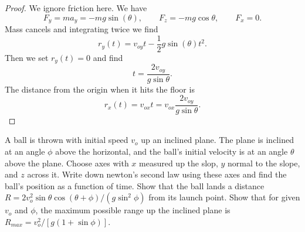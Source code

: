 \begin{proof}
    We ignore friction here.
    We have 
    \[F_y = m a_y = - m g \sin(\theta), \qquad F_z = -mg\cos\theta, \qquad F_x = 0.\]
    Mass cancels and integrating twice we find 
    \[r_y(t) = v_{oy} t - \frac{1}{2} g \sin(\theta) t^2.\]
    Then we set $r_y(t) = 0$ and find 
    \[t = \frac{2v_{oy}}{g\sin\theta}.\]
    The distance from the origin when it hits the floor is 
    \[r_x(t) = v_{ox} t = v_{ox}\frac{2v_{oy}}{g\sin\theta}.\]
\end{proof}


\begin{tcolorbox}[title=Problem 39, breakable]
    A ball is thrown with initial speed $v_o$
    up an inclined plane. The plane is inclined 
    at an angle $\phi$ above the horizontal,
    and the ball's initial velocity  is at 
    an angle $\theta$ above the plane.
    Choose axes with $x$ measured up the 
    slop, $y$ normal to the slope, and $z$ across it.
    Write down newton's second law 
    using these axes and find the ball's position 
    as a function of time. Show that the ball 
    lands a distance $R = 2 v_o^2 \sin \theta \cos(\theta + \phi)/(g \sin^2 \phi)$
    from its launch point. Show that for given 
    $v_o$ and $\phi$, the maximum possible range up the 
    inclined plane is 
    $R_{max} = v_o^2 /[g(1 + \sin \phi)]$.
\end{tcolorbox}

